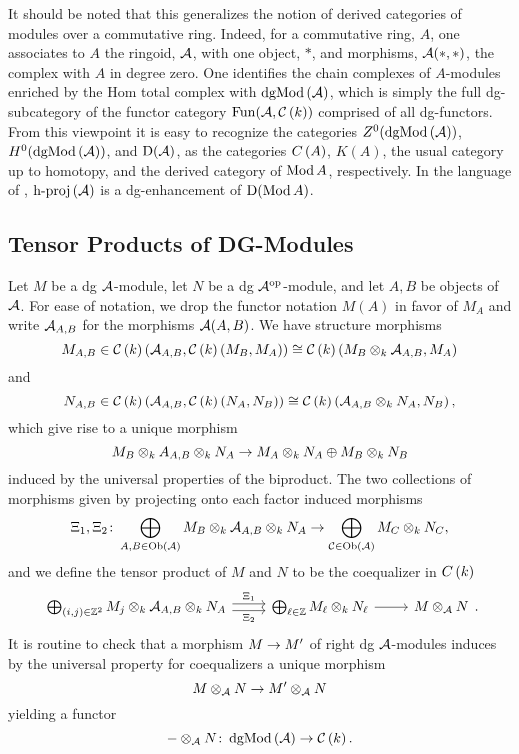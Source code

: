 \documentclass[dissertation.tex]{subfiles}
\begin{document}
It should be noted that this generalizes the notion of derived categories of modules over a commutative ring.
Indeed, for a commutative ring, \(A\), one associates to \(A\) the ringoid, \(\mathcal{A}\), with one object, \(\ast\), and morphisms, \(\mathcal{A}(\ast,\ast)\), the complex with \(A\) in degree zero.
One identifies the chain complexes of \(A\)-modules enriched by the Hom total complex with \(\operatorname{dgMod}\left(\mathcal{A}\right)\), which is simply the full dg-subcategory of the functor category \(\operatorname{Fun}(\mathcal{A}, \mathcal{C}\left(k\right))\) comprised of all dg-functors.
From this viewpoint it is easy to recognize the categories \(Z^0(\operatorname{dgMod}\left(\mathcal{A}\right))\), \(H^0(\operatorname{dgMod}\left(\mathcal{A}\right))\), and \(\mathrm{D}(\mathcal{A})\), as the categories \(C\left(A\right)\), \(K(A)\), the usual category up to homotopy, and the derived category of \(\operatorname{Mod}A\), respectively.
In the language of \cite{Lunts-Orlov}, \(\operatorname{h-proj}\left(\mathcal{A}\right)\) is a dg-enhancement of \(\mathrm{D}(\operatorname{Mod}A)\).


\subsection{Tensor Products of DG-Modules}

Let \(M\) be a dg \(\mathcal{A}\)-module, let \(N\) be a dg \(\mathcal{A}^{{\operatorname{op}}}\)-module, and let \(A, B\) be objects of \(\mathcal{A}\).
For ease of notation, we drop the functor notation \(M(A)\) in favor of \(M_A\) and write \(\mathcal{A}_{A,B}\) for the morphisms \(\mathcal{A}(A, B)\).
We have structure morphisms
\[M_{A,B} \in \mathcal{C}\left(k\right)\left(\mathcal{A}_{A,B}, \mathcal{C}\left(k\right)(M_B, M_A)\right) \cong \mathcal{C}\left(k\right)\left(M_B \otimes_k \mathcal{A}_{A,B}, M_A\right)\]
and
\[N_{A,B} \in \mathcal{C}\left(k\right)\left(\mathcal{A}_{A,B}, \mathcal{C}\left(k\right)(N_A, N_B)\right) \cong \mathcal{C}\left(k\right)\left(\mathcal{A}_{A,B} \otimes_k N_A, N_B\right),\]
which give rise to a unique morphism
\[M_B \otimes_k {A}_{A,B} \otimes_k N_A \rightarrow M_A \otimes_k N_A \oplus M_B \otimes_k N_B\]
induced by the universal properties of the biproduct.
The two collections of morphisms given by projecting onto each factor induced morphisms 
\[\Xi_1, \Xi_2 \colon \bigoplus_{A,B \in \operatorname{Ob}(\mathcal{A})} M_B \otimes_k \mathcal{A}_{A,B} \otimes_k N_A \rightarrow \bigoplus_{\mathcal{C} \in \operatorname{Ob}(\mathcal{A})} M_C \otimes_k N_C,\]
and we define the tensor product of \(M\) and \(N\) to be the coequalizer in \(C\left(k\right)\)
\[\begin{tikzcd}
\bigoplus_{(i,j) \in \Z^2} M_j \otimes_k \A_{A,B} \otimes_k N_A \arrow[shift left]{r}{\Xi_1} \arrow[shift right,swap]{r}{\Xi_2} & \bigoplus_{\ell \in \Z} M_\ell \otimes_k N_\ell\arrow{r} & M \otimes_\A N
\end{tikzcd}.\]It is routine to check that a morphism \(M \rightarrow M^\prime\) of right dg \(\mathcal{A}\)-modules induces by the universal property for coequalizers a unique morphism
\[M \otimes_{\mathcal{A}} N \rightarrow M^\prime \otimes_{\mathcal{A}} N\]
yielding a functor
\[- \otimes_{\mathcal{A}} N \colon \operatorname{dgMod}\left(\mathcal{A}\right) \rightarrow \mathcal{C}\left(k\right).\]
\end{document}

